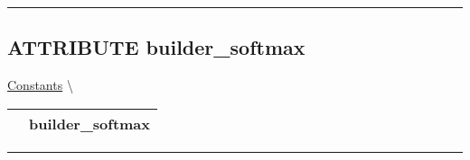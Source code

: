 \par


\rule{\linewidth}{0.5pt}
\subsection*{\textsf{\colorbox{headtoc}{\color{white} ATTRIBUTE}
builder\_softmax}}

\hypertarget{ecldoc:constants.builder_softmax}{}
\hspace{0pt} \hyperlink{ecldoc:Constants}{Constants} \textbackslash 

{\renewcommand{\arraystretch}{1.5}
\begin{tabularx}{\textwidth}{|>{\raggedright\arraybackslash}l|X|}
\hline
\hspace{0pt}\mytexttt{\color{red} } & \textbf{builder\_softmax} \\
\hline
\end{tabularx}
}

\par


\rule{\linewidth}{0.5pt}


